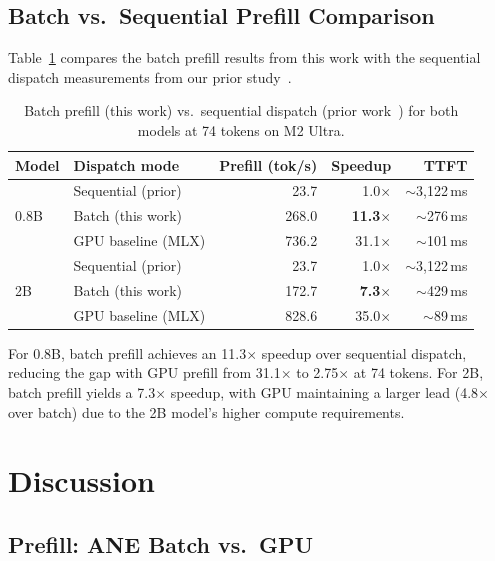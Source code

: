 \documentclass[11pt]{article}
\begin{document}
\subsection{Batch vs.\ Sequential Prefill Comparison}

Table~\ref{tab:batch-vs-seq} compares the batch prefill results from this
work with the sequential dispatch measurements from our prior
study~\cite{atomgradient2026hybrid}.

\begin{table}[h]
\centering
\caption{Batch prefill (this work) vs.\ sequential dispatch
  (prior work~\cite{atomgradient2026hybrid}) for both models at 74 tokens
  on M2 Ultra.}
\label{tab:batch-vs-seq}
\begin{tabular}{llrrr}
\toprule
Model & Dispatch mode & Prefill (tok/s) & Speedup & TTFT \\
\midrule
\multirow{3}{*}{0.8B}
  & Sequential (prior) & 23.7 & 1.0$\times$ & $\sim$3{,}122\,ms \\
  & Batch (this work)  & 268.0 & \textbf{11.3$\times$} & $\sim$276\,ms \\
  & GPU baseline (MLX) & 736.2 & 31.1$\times$ & $\sim$101\,ms \\
\midrule
\multirow{3}{*}{2B}
  & Sequential (prior) & 23.7 & 1.0$\times$ & $\sim$3{,}122\,ms \\
  & Batch (this work)  & 172.7 & \textbf{7.3$\times$} & $\sim$429\,ms \\
  & GPU baseline (MLX) & 828.6 & 35.0$\times$ & $\sim$89\,ms \\
\bottomrule
\end{tabular}
\end{table}

For 0.8B, batch prefill achieves an 11.3$\times$ speedup over sequential
dispatch, reducing the gap with GPU prefill from 31.1$\times$ to
2.75$\times$ at 74 tokens. For 2B, batch prefill yields a 7.3$\times$
speedup, with GPU maintaining a larger lead (4.8$\times$ over batch)
due to the 2B model's higher compute requirements.

\section{Discussion}
\label{sec:discussion}

\subsection{Prefill: ANE Batch vs.\ GPU}
\end{document}
